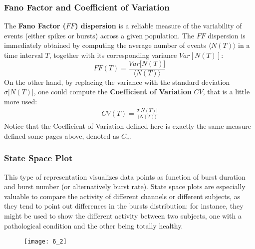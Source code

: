 \subsubsection{Fano Factor and Coefficient of Variation}
The \textbf{Fano Factor (\(FF\)) dispersion} is a reliable measure of the variability of events
(either spikes or bursts) across a given population. The \(FF\) dispersion is
immediately obtained by computing the average number of events \(\langle{N(T)}\rangle\)
in a time interval \(T\), together with its corresponding variance
\(Var[N(T)]\):
\begin{equation*}
    FF(T)=\frac{Var\bigl[N(T)\bigr]}{\langle{N(T)}\rangle}
\end{equation*}
On the other hand, by replacing the variance with the standard deviation
\(\sigma\bigl[N(T)\bigr]\), one could compute the \textbf{Coefficient of Variation}
\(CV\), that is a little more used:
\begin{align*}
    CV(T)=\frac{\sigma\bigl[N(T)\bigr]}{\langle{N(T)}\rangle}
\end{align*}
Notice that the Coefficient of Variation defined here is exactly the same
measure defined some pages above, denoted as \(C_v\).

\subsubsection{State Space Plot}
This type of representation visualizes data points as function of burst duration
and burst number (or alternatively burst rate). State space plots are
especially valuable to compare the activity of different channels or different
subjects, as they tend to point out differences in the bursts distribution:
for instance, they might be used to show the different activity between two
subjects, one with a pathological condition and the other being totally healthy.
\begin{figure}[H]
    \texttt{[image: 6\_2]}
    \centering
\end{figure}